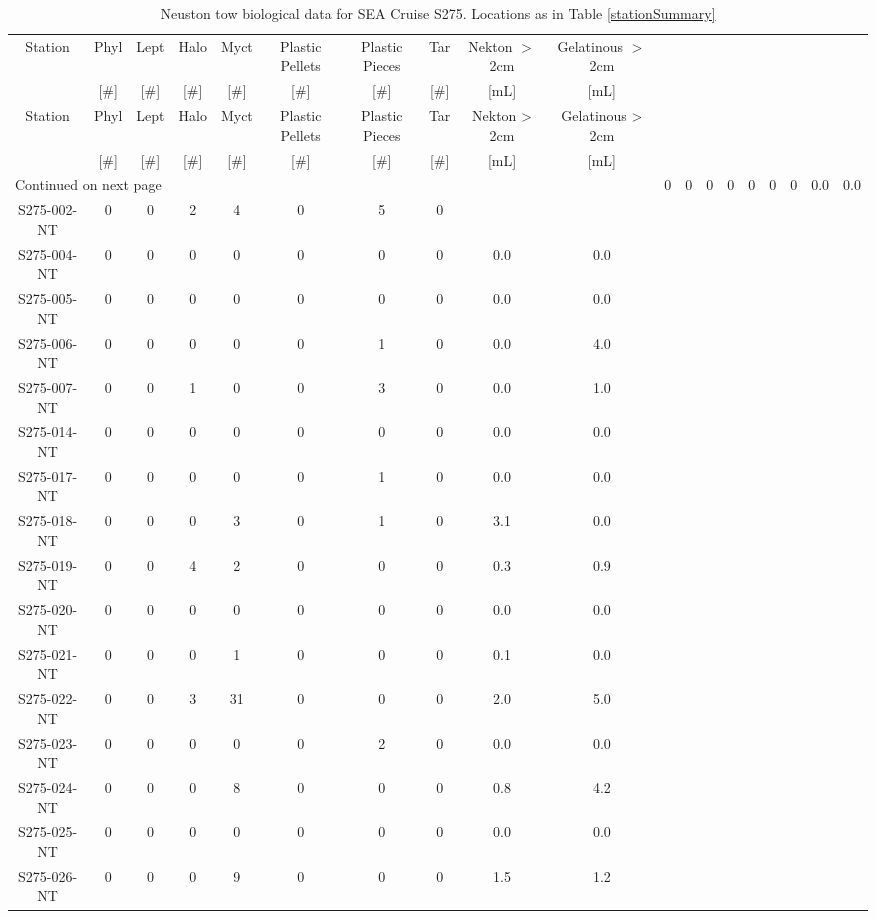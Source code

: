 \begin{longtable}{cccccccccc}
\caption{\label{neuston2} Neuston tow biological data for  SEA Cruise S275. Locations as in Table \ref{stationSummary}} \\ 
 Station & Phyl & Lept & Halo & Myct & Plastic Pellets & Plastic Pieces & Tar & Nekton $>$ 2cm & Gelatinous $>$ 2cm \\ 
   & [\#] & [\#] & [\#] & [\#] & [\#] & [\#] & [\#] & [mL] & [mL] \\ 
\hline\n\endfirsthead
Station & Phyl & Lept & Halo & Myct & Plastic Pellets & Plastic Pieces & Tar & Nekton > 2cm & Gelatinous > 2cm \\ 
 & [\#] & [\#] & [\#] & [\#] & [\#] & [\#] & [\#] & [mL] & [mL] \\ 
\hline
\endhead
\hline
\multicolumn{10}{l}{\footnotesize Continued on next page}
\endfoot
\endlastfoot
 \hline
S275-001-NT & 0 & 0 & 0 & 0 & 0 & 0 & 0 & 0.0 & 0.0 \\ 
  S275-002-NT & 0 & 0 & 2 & 4 & 0 & 5 & 0 &  &  \\ 
  S275-004-NT & 0 & 0 & 0 & 0 & 0 & 0 & 0 & 0.0 & 0.0 \\ 
  S275-005-NT & 0 & 0 & 0 & 0 & 0 & 0 & 0 & 0.0 & 0.0 \\ 
  S275-006-NT & 0 & 0 & 0 & 0 & 0 & 1 & 0 & 0.0 & 4.0 \\ 
  S275-007-NT & 0 & 0 & 1 & 0 & 0 & 3 & 0 & 0.0 & 1.0 \\ 
  S275-014-NT & 0 & 0 & 0 & 0 & 0 & 0 & 0 & 0.0 & 0.0 \\ 
  S275-017-NT & 0 & 0 & 0 & 0 & 0 & 1 & 0 & 0.0 & 0.0 \\ 
  S275-018-NT & 0 & 0 & 0 & 3 & 0 & 1 & 0 & 3.1 & 0.0 \\ 
  S275-019-NT & 0 & 0 & 4 & 2 & 0 & 0 & 0 & 0.3 & 0.9 \\ 
  S275-020-NT & 0 & 0 & 0 & 0 & 0 & 0 & 0 & 0.0 & 0.0 \\ 
  S275-021-NT & 0 & 0 & 0 & 1 & 0 & 0 & 0 & 0.1 & 0.0 \\ 
  S275-022-NT & 0 & 0 & 3 & 31 & 0 & 0 & 0 & 2.0 & 5.0 \\ 
  S275-023-NT & 0 & 0 & 0 & 0 & 0 & 2 & 0 & 0.0 & 0.0 \\ 
  S275-024-NT & 0 & 0 & 0 & 8 & 0 & 0 & 0 & 0.8 & 4.2 \\ 
  S275-025-NT & 0 & 0 & 0 & 0 & 0 & 0 & 0 & 0.0 & 0.0 \\ 
  S275-026-NT & 0 & 0 & 0 & 9 & 0 & 0 & 0 & 1.5 & 1.2 \\ 

\end{longtable}

